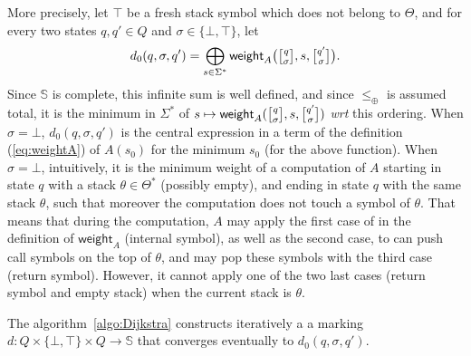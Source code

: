 \documentclass[runningheads]{llncs}
\def\wrt{\textit{wrt}\xspace}
\def\<#1>{\langle #1 \rangle}
\newcommand{\Semiring}{\mathbb{S}}
\def\weight{\mathsf{weight}}
\newcommand{\config}[2]{\ensuremath \genfrac{[}{]}{0pt}{}{#1}{#2}}
\begin{document}
\noindent
More precisely, 
let $\top$ be a fresh stack symbol which does not belong to $\Theta$,
and for every two states $q, q' \in Q$ and $\sigma \in \{ \bot, \top \}$, 
let 
\[ 
  d_0(q, \sigma, q') = \bigoplus_{s\in \Sigma^*} 
  \textstyle
  \weight_A\bigl(\config{q}{\sigma}, s, \config{q'}{\sigma}\bigr). 
\]
Since $\Semiring$ is complete, this infinite sum is well defined, 
and since $\leq_\oplus$ is assumed total, it is the minimum in $\Sigma^*$
of $s \mapsto \weight_A(\config{q}{\sigma}, s, \config{q'}{\sigma})$ \wrt this ordering.
%
When $\sigma = \bot$, $d_0(q, \sigma, q')$ is the central 
expression in a term of the definition (\ref{eq:weightA}) of $A(s_0)$ for the minimum $s_0$
(for the above function).
When $\sigma = \bot$, intuitively, it is the minimum weight of a computation of $A$
starting in state $q$ with a stack $\theta \in \Theta^*$ (possibly empty), 
and ending in state $q$ with the same stack $\theta$, such that moreover 
the computation does not touch a symbol of $\theta$. 
That means that during the computation, 
$A$ may apply the first case of in the definition of $\weight_A$ (internal symbol),
as well as the second case, to can push call symbols on the top of $\theta$, 
and may pop these symbols with the third case (return symbol). 
However, it cannot apply one of the two last cases (return symbol and empty stack)
when the current stack is $\theta$.

The algorithm~\ref{algo:Dijkstra}
constructs iteratively a a marking $d : Q \times \{ \bot, \top \} \times Q \to \Semiring$
that converges eventually to $d_0(q, \sigma, q')$. 
\end{document}
